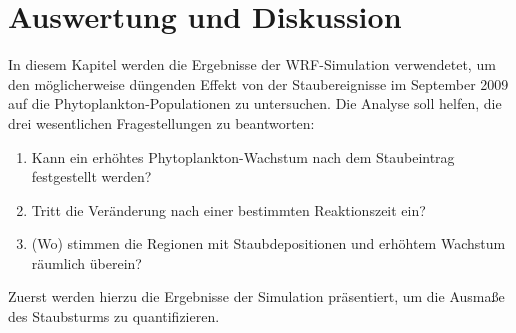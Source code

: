 \documentclass[12pt,a4paper,onecolumn,draft]{scrartcl}
\begin{document}
\section{Auswertung und Diskussion} \label{sec:auswertung}
In diesem Kapitel werden die Ergebnisse der WRF-Simulation verwendetet, um den möglicherweise düngenden Effekt von der Staubereignisse im September 2009 auf die Phytoplankton-Populationen zu untersuchen. Die Analyse soll helfen, die drei wesentlichen Fragestellungen zu beantworten:
\begin{enumerate}
\item Kann ein erhöhtes Phytoplankton-Wachstum nach dem Staubeintrag festgestellt werden?
\item Tritt die Veränderung nach einer bestimmten Reaktionszeit ein?
\item (Wo) stimmen die Regionen mit Staubdepositionen und erhöhtem Wachstum räumlich überein?
\end{enumerate}
Zuerst werden hierzu die Ergebnisse der Simulation präsentiert, um die Ausmaße des Staubsturms zu quantifizieren. 
\end{document}
